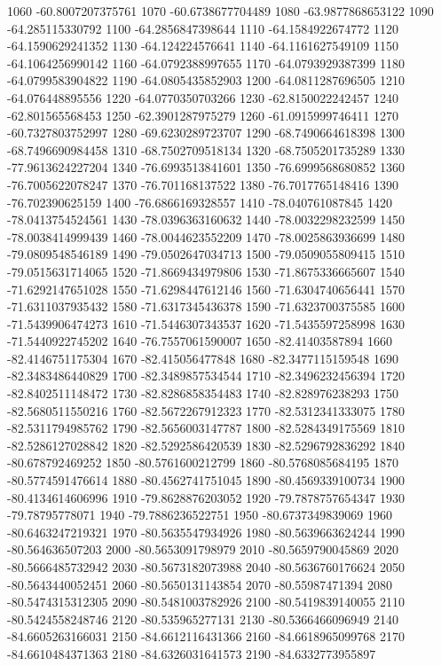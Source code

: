 {1060 -60.8007207375761
1070 -60.6738677704489
1080 -63.9877868653122
1090 -64.285115330792
1100 -64.2856847398644
1110 -64.1584922674772
1120 -64.1590629241352
1130 -64.124224576641
1140 -64.1161627549109
1150 -64.1064256990142
1160 -64.0792388997655
1170 -64.0793929387399
1180 -64.0799583904822
1190 -64.0805435852903
1200 -64.0811287696505
1210 -64.076448895556
1220 -64.0770350703266
1230 -62.8150022242457
1240 -62.801565568453
1250 -62.3901287975279
1260 -61.0915999746411
1270 -60.7327803752997
1280 -69.6230289723707
1290 -68.7490664618398
1300 -68.7496690984458
1310 -68.7502709518134
1320 -68.7505201735289
1330 -77.9613624227204
1340 -76.6993513841601
1350 -76.6999568680852
1360 -76.7005622078247
1370 -76.701168137522
1380 -76.7017765148416
1390 -76.702390625159
1400 -76.6866169328557
1410 -78.040761087845
1420 -78.0413754524561
1430 -78.0396363160632
1440 -78.0032298232599
1450 -78.0038414999439
1460 -78.0044623552209
1470 -78.0025863936699
1480 -79.0809548546189
1490 -79.0502647034713
1500 -79.0509055809415
1510 -79.0515631714065
1520 -71.8669434979806
1530 -71.8675336665607
1540 -71.6292147651028
1550 -71.6298447612146
1560 -71.6304740656441
1570 -71.6311037935432
1580 -71.6317345436378
1590 -71.6323700375585
1600 -71.5439906474273
1610 -71.5446307343537
1620 -71.5435597258998
1630 -71.5440922745202
1640 -76.7557061590007
1650 -82.41403587894
1660 -82.4146751175304
1670 -82.415056477848
1680 -82.3477115159548
1690 -82.3483486440829
1700 -82.3489857534544
1710 -82.3496232456394
1720 -82.8402511148472
1730 -82.8286858354483
1740 -82.828976238293
1750 -82.5680511550216
1760 -82.5672267912323
1770 -82.5312341333075
1780 -82.5311794985762
1790 -82.5656003147787
1800 -82.5284349175569
1810 -82.5286127028842
1820 -82.5292586420539
1830 -82.5296792836292
1840 -80.678792469252
1850 -80.5761600212799
1860 -80.5768085684195
1870 -80.5774591476614
1880 -80.4562741751045
1890 -80.4569339100734
1900 -80.4134614606996
1910 -79.8628876203052
1920 -79.7878757654347
1930 -79.78795778071
1940 -79.7886236522751
1950 -80.6737349839069
1960 -80.6463247219321
1970 -80.5635547934926
1980 -80.5639663624244
1990 -80.564636507203
2000 -80.5653091798979
2010 -80.5659790045869
2020 -80.5666485732942
2030 -80.5673182073988
2040 -80.5636760176624
2050 -80.5643440052451
2060 -80.5650131143854
2070 -80.55987471394
2080 -80.5474315312305
2090 -80.5481003782926
2100 -80.5419839140055
2110 -80.5424558248746
2120 -80.535965277131
2130 -80.5366466096949
2140 -84.6605263166031
2150 -84.6612116431366
2160 -84.6618965099768
2170 -84.6610484371363
2180 -84.6326031641573
2190 -84.6332773955897
}
